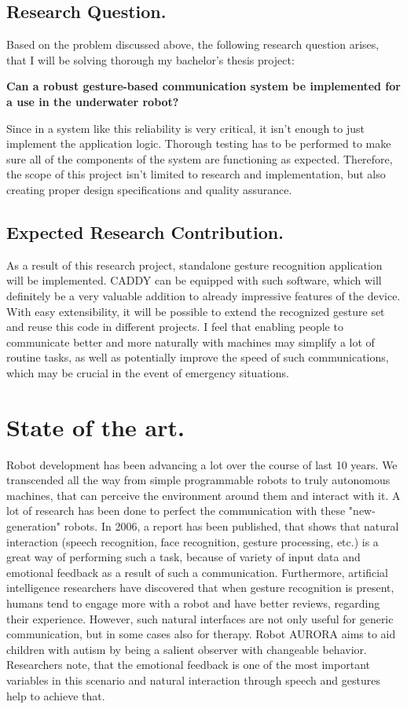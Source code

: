 \documentclass[a4paper,11pt,oneside]{article}
\begin{document}
\subsection{Research Question.}

Based on the problem discussed above, the following research question arises, that I will be solving thorough my bachelor's thesis project:

\textbf{Can a robust gesture-based communication system be implemented for a use in the underwater robot?}

Since in a system like this reliability is very critical, it isn't enough to just implement the application logic. Thorough testing has to be performed to make sure all of the components of the system are functioning as expected. Therefore, the scope of this project isn't limited to research and implementation, but also creating proper design specifications and quality assurance.

\subsection{Expected Research Contribution.}

As a result of this research project, standalone gesture recognition application will be implemented. CADDY can be equipped with such software, which will definitely be a very valuable addition to already impressive features of the device. With easy extensibility, it will be possible to extend the recognized gesture set and reuse this code in different projects. I feel that enabling people to communicate better and more naturally with machines may simplify a lot of routine tasks, as well as potentially improve the speed of such communications, which may be crucial in the event of emergency situations.

\section{State of the art.}

Robot development has been advancing a lot over the course of last 10 years. We transcended all the way from simple programmable robots to truly autonomous machines, that can perceive the environment around them and interact with it. A lot of research has been done to perfect the communication with these "new-generation" robots. In 2006, a report \cite{SA01} has been published, that shows that natural interaction (speech recognition, face recognition, gesture processing, etc.) is a great way of performing such a task, because of variety of input data and emotional feedback as a result of such a communication. Furthermore, artificial intelligence researchers \cite{SA02} have discovered that when gesture recognition is present, humans tend to engage more with a robot and have better reviews, regarding their experience. However, such natural interfaces are not only useful for generic communication, but in some cases also for therapy. Robot AURORA \cite{SA03} aims to aid children with autism by being a salient observer with changeable behavior. Researchers note, that the emotional feedback is one of the most important variables in this scenario and natural interaction through speech and gestures help to achieve that.
\end{document}
